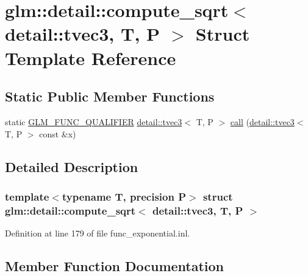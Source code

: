 \hypertarget{structglm_1_1detail_1_1compute__sqrt_3_01detail_1_1tvec3_00_01_t_00_01_p_01_4}{}\section{glm\+:\+:detail\+:\+:compute\+\_\+sqrt$<$ detail\+:\+:tvec3, T, P $>$ Struct Template Reference}
\label{structglm_1_1detail_1_1compute__sqrt_3_01detail_1_1tvec3_00_01_t_00_01_p_01_4}
\subsection*{Static Public Member Functions}
\begin{DoxyCompactItemize}
\item 
static \hyperlink{setup_8hpp_a33fdea6f91c5f834105f7415e2a64407}{G\+L\+M\+\_\+\+F\+U\+N\+C\+\_\+\+Q\+U\+A\+L\+I\+F\+I\+ER} \hyperlink{structglm_1_1detail_1_1tvec3}{detail\+::tvec3}$<$ T, P $>$ \hyperlink{structglm_1_1detail_1_1compute__sqrt_3_01detail_1_1tvec3_00_01_t_00_01_p_01_4_a18a51ad87ca9848b797060c14651dafe}{call} (\hyperlink{structglm_1_1detail_1_1tvec3}{detail\+::tvec3}$<$ T, P $>$ const \&x)
\end{DoxyCompactItemize}


\subsection{Detailed Description}
\subsubsection*{template$<$typename T, precision P$>$\newline
struct glm\+::detail\+::compute\+\_\+sqrt$<$ detail\+::tvec3, T, P $>$}



Definition at line 179 of file func\+\_\+exponential.\+inl.



\subsection{Member Function Documentation}
\mbox{\label{structglm_1_1detail_1_1compute__sqrt_3_01detail_1_1tvec3_00_01_t_00_01_p_01_4_a18a51ad87ca9848b797060c14651dafe}} 
